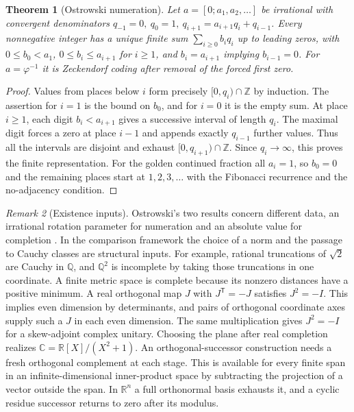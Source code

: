\documentclass[11pt,reqno]{amsart}
\newtheorem{theorem}{Theorem}[section]
\theoremstyle{definition}
\theoremstyle{remark}
\newtheorem{remark}[theorem]{Remark}
\numberwithin{equation}{section}
\newcommand{\R}{\mathbb{R}}
\newcommand{\C}{\mathbb{C}}
\newcommand{\Q}{\mathbb{Q}}
\newcommand{\Z}{\mathbb{Z}}
\begin{document}
\begin{theorem}[Ostrowski numeration]\label{m9:ostrowski-digits}
Let \(a=[0;a_1,a_2,\ldots]\) be irrational with convergent
denominators \(q_{-1}=0,\ q_0=1,\ q_{i+1}=a_{i+1}q_i+q_{i-1}\).
Every nonnegative integer has a unique finite sum
\(\sum_{i\ge0}b_iq_i\) up to leading zeros, with
\(0\le b_0<a_1\), \(0\le b_i\le a_{i+1}\) for \(i\ge1\),
and \(b_i=a_{i+1}\) implying \(b_{i-1}=0\).
For \(a=\varphi^{-1}\) it is Zeckendorf coding after removal
of the forced first zero.
\end{theorem}
\begin{proof}
Values from places below \(i\) form precisely \([0,q_i)\cap\Z\)
by induction. The assertion for \(i=1\) is the bound on \(b_0\),
and for \(i=0\) it is the empty sum. At place \(i\ge1\), each
digit \(b_i<a_{i+1}\) gives a successive interval of length
\(q_i\). The maximal digit forces a zero at place \(i-1\)
and appends exactly \(q_{i-1}\) further values. Thus all the
intervals are disjoint and exhaust \([0,q_{i+1})\cap\Z\).
Since \(q_i\to\infty\), this proves the finite representation.
For the golden continued fraction all \(a_i=1\),
so \(b_0=0\) and the remaining places start at \(1,2,3,\ldots\)
with the Fibonacci recurrence and the no-adjacency condition.
\end{proof}

\begin{remark}[Existence inputs]\label{m9:inputs}
Ostrowski's two results concern different data, an irrational
rotation parameter for numeration and an absolute value for
completion \cite{m9:Ostrowski}. In the comparison framework the
choice of a norm and the passage to Cauchy classes are structural
inputs. For example, rational truncations of \(\sqrt2\) are
Cauchy in \(\Q\), and \(\Q^2\) is incomplete by taking those
truncations in one coordinate. A finite metric space is
complete because its nonzero distances have a positive minimum.
A real orthogonal map \(J\) with \(J^{\mathsf T}=-J\) satisfies
\(J^2=-I\). This implies even dimension by determinants, and
pairs of orthogonal coordinate axes supply such a \(J\) in each
even dimension. The same multiplication gives \(J^2=-I\)
for a skew-adjoint complex unitary. Choosing the plane after
real completion realizes \(\C=\R[X]/(X^2+1)\).
An orthogonal-successor construction needs a fresh orthogonal
complement at each stage. This is available for every finite
span in an infinite-dimensional inner-product space by subtracting
the projection of a vector outside the span. In \(\R^n\) a
full orthonormal basis exhausts it, and a cyclic residue successor
returns to zero after its modulus.
\end{remark}
\end{document}
